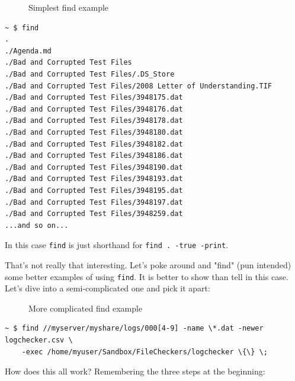 \documentclass[10pt,]{book}
\numberwithin{figure}{chapter}
\DeclareRobustCommand{\drcap}[1]{\begin{figure}[H]\caption{#1}\end{figure}}
\begin{document}
\drcap{Simplest find example}

\begin{verbatim}
~ $ find
.
./Agenda.md
./Bad and Corrupted Test Files
./Bad and Corrupted Test Files/.DS_Store
./Bad and Corrupted Test Files/2008 Letter of Understanding.TIF
./Bad and Corrupted Test Files/3948175.dat
./Bad and Corrupted Test Files/3948176.dat
./Bad and Corrupted Test Files/3948178.dat
./Bad and Corrupted Test Files/3948180.dat
./Bad and Corrupted Test Files/3948182.dat
./Bad and Corrupted Test Files/3948186.dat
./Bad and Corrupted Test Files/3948190.dat
./Bad and Corrupted Test Files/3948193.dat
./Bad and Corrupted Test Files/3948195.dat
./Bad and Corrupted Test Files/3948197.dat
./Bad and Corrupted Test Files/3948259.dat
...and so on...
\end{verbatim}

In this case \texttt{find} is just shorthand for
\texttt{find . -true -print}.

That's not really that interesting. Let's poke around and "find" (pun
intended) some better examples of using \texttt{find}. It is better to
show than tell in this case. Let's dive into a semi-complicated one and
pick it apart:

\drcap{More complicated find example}

\begin{verbatim}
~ $ find //myserver/myshare/logs/000[4-9] -name \*.dat -newer logchecker.csv \
    -exec /home/myuser/Sandbox/FileCheckers/logchecker \{\} \;
\end{verbatim}

How does this all work? Remembering the three steps at the beginning:
\end{document}
